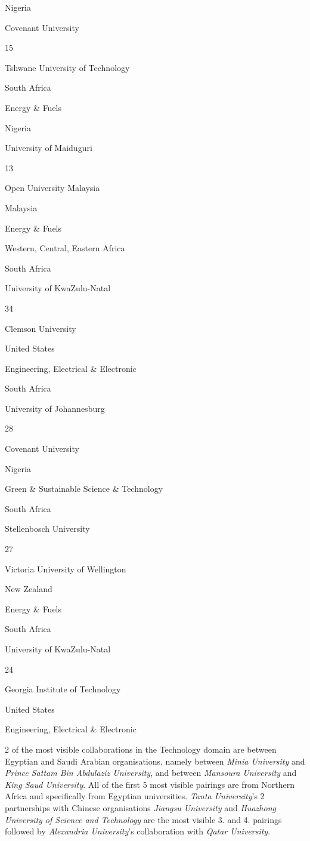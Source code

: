 \documentclass[
]{book}
\begin{document}
{Nigeria }

{Covenant University }

{15}

{Tshwane University of Technology }

{South Africa }

{Energy \& Fuels }

{Nigeria }

{University of Maiduguri }

{13}

{Open University Malaysia }

{Malaysia }

{Energy \& Fuels }

Western, Central, Eastern Africa

{South Africa}

{University of KwaZulu-Natal }

{34}

{Clemson University }

{United States}

{Engineering, Electrical \& Electronic }

{South Africa}

{University of Johannesburg }

{28}

{Covenant University }

{Nigeria }

{Green \& Sustainable Science \& Technology}

{South Africa}

{Stellenbosch University }

{27}

{Victoria University of Wellington }

{New Zealand }

{Energy \& Fuels }

{South Africa}

{University of KwaZulu-Natal }

{24}

{Georgia Institute of Technology }

{United States}

{Engineering, Electrical \& Electronic }

2 of the most visible collaborations in the Technology domain are between Egyptian and Saudi Arabian organisations, namely between \emph{Minia University} and \emph{Prince Sattam Bin Abdulaziz University}, and between \emph{Mansoura University} and \emph{King Saud University}. All of the first 5 most visible pairings are from Northern Africa and specifically from Egyptian universities. \emph{Tanta University}'s 2 partnerships with Chinese organisations \emph{Jiangsu University} and \emph{Huazhong University of Science and Technology} are the most visible 3. and 4. pairings followed by \emph{Alexandria University}'s collaboration with \emph{Qatar University}.
\end{document}
